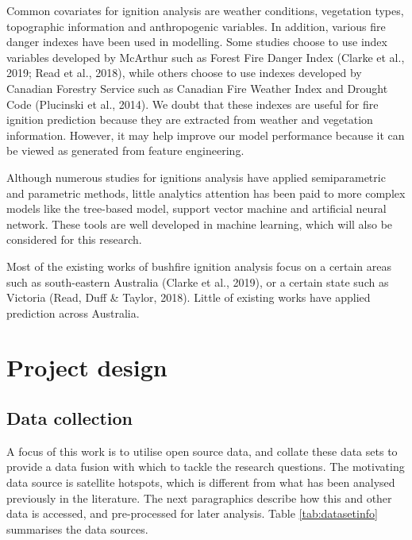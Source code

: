 \documentclass[11pt,a4paper,]{article}
\begin{document}
Common covariates for ignition analysis are weather conditions, vegetation types, topographic information and anthropogenic variables. In addition, various fire danger indexes have been used in modelling. Some studies choose to use index variables developed by McArthur such as Forest Fire Danger Index (Clarke et al., 2019; Read et al., 2018), while others choose to use indexes developed by Canadian Forestry Service such as Canadian Fire Weather Index and Drought Code (Plucinski et al., 2014). We doubt that these indexes are useful for fire ignition prediction because they are extracted from weather and vegetation information. However, it may help improve our model performance because it can be viewed as generated from feature engineering.

Although numerous studies for ignitions analysis have applied semiparametric and parametric methods, little analytics attention has been paid to more complex models like the tree-based model, support vector machine and artificial neural network. These tools are well developed in machine learning, which will also be considered for this research.

Most of the existing works of bushfire ignition analysis focus on a certain areas such as south-eastern Australia (Clarke et al., 2019), or a certain state such as Victoria (Read, Duff \& Taylor, 2018). Little of existing works have applied prediction across Australia.

\hypertarget{project-design}{%
\section{Project design}\label{project-design}}

\hypertarget{data-collection}{%
\subsection{Data collection}\label{data-collection}}

A focus of this work is to utilise open source data, and collate these data sets to provide a data fusion with which to tackle the research questions. The motivating data source is satellite hotspots, which is different from what has been analysed previously in the literature. The next paragraphics describe how this and other data is accessed, and pre-processed for later analysis. Table \ref{tab:datasetinfo} summarises the data sources.
\end{document}
